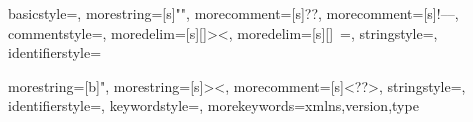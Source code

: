 {
  basicstyle=\ttfamily,
  morestring=[s]{"}{"},
  morecomment=[s]{?}{?},
  morecomment=[s]{!--}{--},
  commentstyle=\color{darkgreen},
  moredelim=[s][\color{black}]{>}{<},
  moredelim=[s][\color{red}]{\ }{=},
  stringstyle=\color{darkgreen},
  identifierstyle=\color{blue}
}

{
  morestring=[b]",
  morestring=[s]{>}{<},
  morecomment=[s]{<?}{?>},
  stringstyle=\color{black},
  identifierstyle=\color{blue},
  keywordstyle=\color{cyan},
  morekeywords={xmlns,version,type}%
}

\usepackage[dvipsnames]{xcolor} %
\usepackage{wrapfig} %